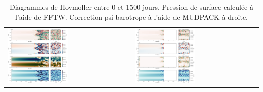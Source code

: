 \documentclass[10pt]{article}
\numberwithin{equation}{section}
\begin{document}
\begin{table}[htbp]
\caption{\label{tab:org8376a6f}Diagrammes de Hovmoller entre 0 et 1500 jours. Pression de surface calculée à l'aide de FFTW. Correction psi barotrope à l'aide de MUDPACK à droite.}
\centering
\begin{tabular}{ll}
\includegraphics[width=0.5\textwidth]{figures/tests/2023-06-15_hovmoller1_t=1500days_fft.png} & \includegraphics[width=0.5\textwidth]{figures/tests/2023-06-16_hovmoller1_t=1500days_mud.png}\\[0pt]
\end{tabular}
\end{table}
\end{document}
